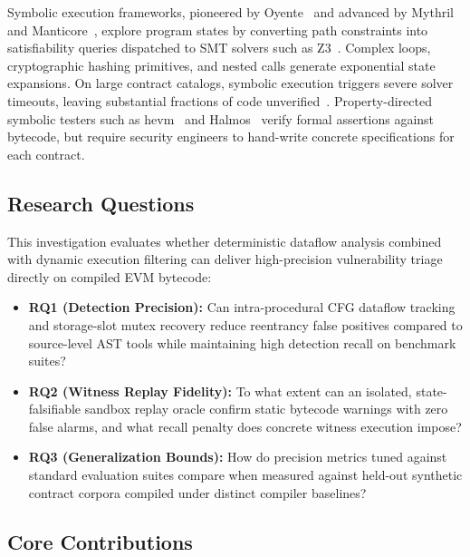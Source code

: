 \documentclass[pdflatex,sn-mathphys]{sn-jnl}
\theoremstyle{thmstyleone}
\theoremstyle{thmstyletwo}
\begin{document}
Symbolic execution frameworks, pioneered by Oyente~\cite{luu2016making} and advanced by Mythril~\cite{mueller2018mythril} and Manticore~\cite{mossberg2019manticore}, explore program states by converting path constraints into satisfiability queries dispatched to SMT solvers such as Z3~\cite{de2008z3}. Complex loops, cryptographic hashing primitives, and nested calls generate exponential state expansions. On large contract catalogs, symbolic execution triggers severe solver timeouts, leaving substantial fractions of code unverified~\cite{durieux2020empirical}. Property-directed symbolic testers such as hevm~\cite{dxo2024hevm} and Halmos~\cite{a16z2023halmos} verify formal assertions against bytecode, but require security engineers to hand-write concrete specifications for each contract.

\subsection{Research Questions}\label{sec:intro:rqs}

This investigation evaluates whether deterministic dataflow analysis combined with dynamic execution filtering can deliver high-precision vulnerability triage directly on compiled EVM bytecode:

\begin{itemize}
    \item \textbf{RQ1 (Detection Precision):} Can intra-procedural CFG dataflow tracking and storage-slot mutex recovery reduce reentrancy false positives compared to source-level AST tools while maintaining high detection recall on benchmark suites?
    \item \textbf{RQ2 (Witness Replay Fidelity):} To what extent can an isolated, state-falsifiable sandbox replay oracle confirm static bytecode warnings with zero false alarms, and what recall penalty does concrete witness execution impose?
    \item \textbf{RQ3 (Generalization Bounds):} How do precision metrics tuned against standard evaluation suites compare when measured against held-out synthetic contract corpora compiled under distinct compiler baselines?
\end{itemize}

\subsection{Core Contributions}\label{sec:intro:contrib}
\end{document}

